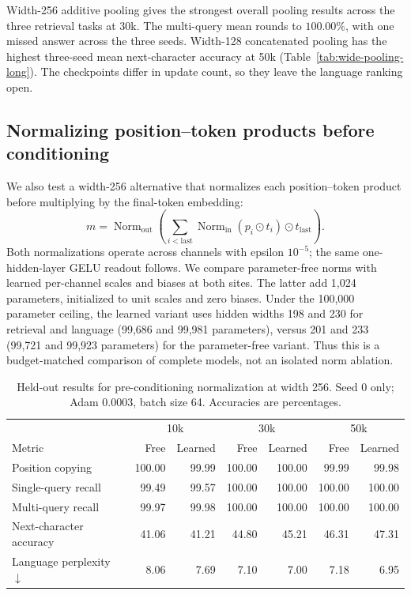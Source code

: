 \documentclass[11pt]{article}
\begin{document}
Width-256 additive pooling gives the strongest overall pooling results across
the three retrieval tasks at 30k. The multi-query mean rounds to \(100.00\%\),
with one missed answer across the three seeds. Width-128 concatenated pooling
has the highest three-seed mean next-character accuracy at 50k
(Table~\ref{tab:wide-pooling-long}). The checkpoints differ in update count,
so they leave the language ranking open.

\subsection{Normalizing position--token products before conditioning}
We also test a width-256 alternative that normalizes each position--token
product before multiplying by the final-token embedding:
\[
 m=\operatorname{Norm}_{\mathrm{out}}\!\left(
 \sum_{i<\mathrm{last}}\operatorname{Norm}_{\mathrm{in}}(p_i\odot t_i)
 \odot t_{\mathrm{last}}\right).
\]
Both normalizations operate across channels with epsilon \(10^{-5}\); the
same one-hidden-layer GELU readout follows. We compare parameter-free norms
with learned per-channel scales and biases at both sites. The latter add 1,024
parameters, initialized to unit scales and zero biases. Under the 100,000
parameter ceiling, the learned variant uses hidden widths 198 and 230 for
retrieval and language (99,686 and 99,981 parameters), versus 201 and 233
(99,721 and 99,923 parameters) for the parameter-free variant. Thus this is
a budget-matched comparison of complete models, not an isolated norm ablation.

\begin{table}[htbp]
\centering\small
\caption{Held-out results for pre-conditioning normalization at width 256.
Seed 0 only; Adam 0.0003, batch size 64. Accuracies are percentages.}
\label{tab:precondition-norm}
\begin{tabular}{lrrrrrr}
\toprule
 & \multicolumn{2}{c}{10k} & \multicolumn{2}{c}{30k} & \multicolumn{2}{c}{50k}\\
Metric & Free & Learned & Free & Learned & Free & Learned\\
\midrule
Position copying & 100.00 & 99.99 & 100.00 & 100.00 & 99.99 & 99.98\\
Single-query recall & 99.49 & 99.57 & 100.00 & 100.00 & 100.00 & 100.00\\
Multi-query recall & 99.97 & 99.98 & 100.00 & 100.00 & 100.00 & 100.00\\
Next-character accuracy & 41.06 & 41.21 & 44.80 & 45.21 & 46.31 & 47.31\\
Language perplexity \(\downarrow\) & 8.06 & 7.69 & 7.10 & 7.00 & 7.18 & 6.95\\
\bottomrule
\end{tabular}
\end{table}
\end{document}
